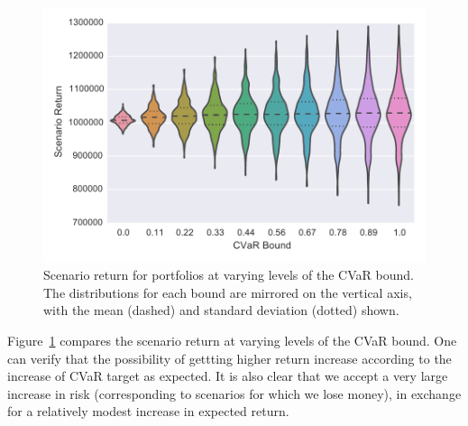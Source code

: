 \begin{figure}[tp]
\centering
\includegraphics{../pic/Scenario_Return.pdf}
\caption{Scenario return for portfolios at varying levels of the CVaR bound.
The distributions for each bound are mirrored on the vertical axis, with the mean (dashed) and standard deviation (dotted) shown.}
\label{fig:scenarioreturn}
\end{figure}

Figure~\ref{fig:scenarioreturn} compares the scenario return at varying levels of the CVaR bound.
One can verify that the possibility of gettting higher return increase according to the increase of CVaR target  as expected.
It is also clear that we accept a very large increase in risk (corresponding to scenarios for which we lose money), in exchange for a relatively modest increase in expected return.


